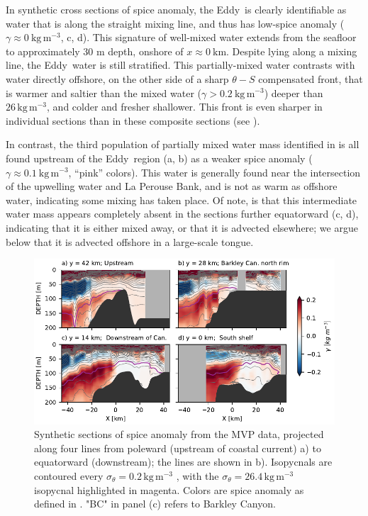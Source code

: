 \documentclass[draft]{agujournal2019}
\newcommand*{\Eddy}{{\sc Eddy}}
\begin{document}
In synthetic cross sections of spice anomaly, the \Eddy\ is clearly identifiable as water that is along the straight mixing line, and thus has low-spice anomaly ($\gamma \approx 0\ \mathrm{kg\,m^{-3}}$, c, d).  This signature of well-mixed water extends from the seafloor to approximately 30 m depth, onshore of $x \approx 0\ \mathrm{km}$.  Despite lying along a mixing line, the \Eddy\ water is still stratified.  This partially-mixed water contrasts with water directly offshore, on the other side of a sharp $\theta-S$ compensated front, that is warmer and saltier than the mixed water ($\gamma > 0.2\ \mathrm{kg\,m^{-3}}$) deeper than $26\,\mathrm{kg\,m^{-3}}$, and colder and fresher shallower.  This front is even sharper in individual sections than in these composite sections (see ).

In contrast, the third population of partially mixed water mass identified in  is all found upstream of the \Eddy\ region (a, b) as a weaker spice anomaly ($\gamma \approx 0.1\ \mathrm{kg\,m^{-3}}$, ``pink'' colors).  This water is generally found near the intersection of the upwelling water and La Perouse Bank, and is not as warm as offshore water, indicating some mixing has taken place.  Of note, is that this intermediate water mass appears completely absent in the sections further equatorward (c, d), indicating that it is either mixed away, or that it is advected elsewhere; we argue below that it is advected offshore in a large-scale tongue.

\begin{figure}[htbp]
  \begin{center}
    \includegraphics[width=6.2in]{CrossSectionsSpice}
    \caption{Synthetic sections of spice anomaly from the MVP data, projected along four lines from poleward (upstream of coastal current) a) to equatorward (downstream); the lines are shown in b).    Isopycnals are contoured every $\sigma_{\theta} = 0.2\,\mathrm{kg\,m^{-3}}$ , with the $\sigma_{\theta} = 26.4\,\mathrm{kg\,m^{-3}}$ isopycnal highlighted in magenta.  Colors are spice anomaly as defined in . "BC" in panel (c) refers to Barkley Canyon.
      \label{fig:CrossSectionsSpice} }
  \end{center}
\end{figure}
\end{document}
